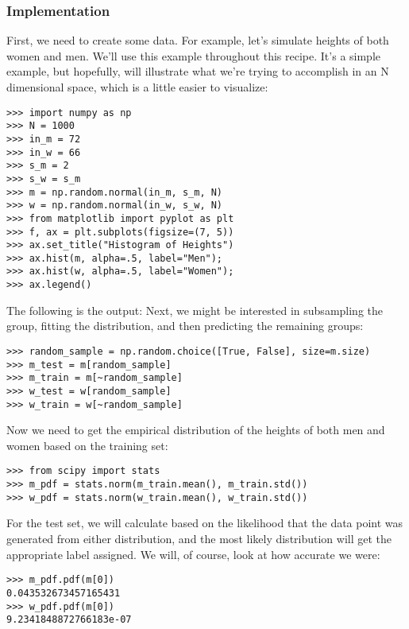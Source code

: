 \documentclass[SKL-MASTER.tex]{subfiles}
\begin{document}
\subsubsection{Implementation}
First, we need to create some data. For example, let's simulate heights of both women and
men. We'll use this example throughout this recipe. It's a simple example, but hopefully, will
illustrate what we're trying to accomplish in an N dimensional space, which is a little easier
to visualize:
\begin{framed}
\begin{verbatim}
>>> import numpy as np
>>> N = 1000
>>> in_m = 72
>>> in_w = 66
>>> s_m = 2
>>> s_w = s_m
>>> m = np.random.normal(in_m, s_m, N)
>>> w = np.random.normal(in_w, s_w, N)
>>> from matplotlib import pyplot as plt
>>> f, ax = plt.subplots(figsize=(7, 5))
>>> ax.set_title("Histogram of Heights")
>>> ax.hist(m, alpha=.5, label="Men");
>>> ax.hist(w, alpha=.5, label="Women");
>>> ax.legend()
\end{verbatim}
\end{framed}
The following is the output:
Next, we might be interested in subsampling the group, fitting the distribution, and then
predicting the remaining groups:
\begin{framed}
	\begin{verbatim}
>>> random_sample = np.random.choice([True, False], size=m.size)
>>> m_test = m[random_sample]
>>> m_train = m[~random_sample]
>>> w_test = w[random_sample]
>>> w_train = w[~random_sample]
\end{verbatim}
\end{framed}
Now we need to get the empirical distribution of the heights of both men and women based
on the training set:
\begin{framed}
	\begin{verbatim}
>>> from scipy import stats
>>> m_pdf = stats.norm(m_train.mean(), m_train.std())
>>> w_pdf = stats.norm(w_train.mean(), w_train.std())
\end{verbatim}
\end{framed}
For the test set, we will calculate based on the likelihood that the data point was generated
from either distribution, and the most likely distribution will get the appropriate label assigned.
We will, of course, look at how accurate we were:
\begin{framed}
	\begin{verbatim}
>>> m_pdf.pdf(m[0])
0.043532673457165431
>>> w_pdf.pdf(m[0])
9.2341848872766183e-07
\end{verbatim}
\end{framed}
\end{document}
